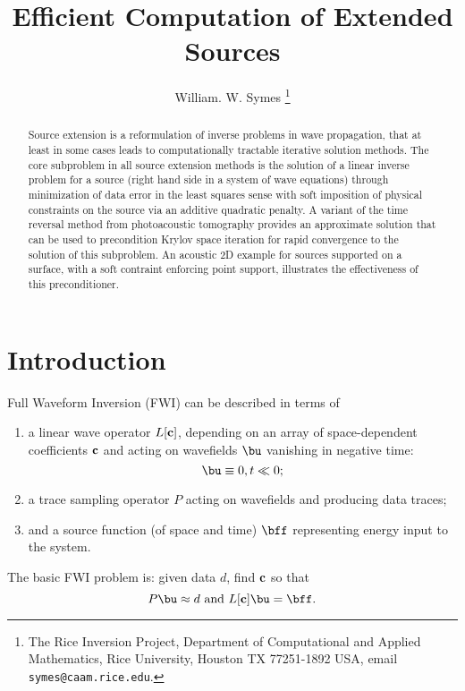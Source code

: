 \title{Efficient Computation of Extended Sources}
\author{William. W. Symes \thanks{The Rice Inversion Project,
Department of Computational and Applied Mathematics, Rice University,
Houston TX 77251-1892 USA, email {\tt symes@caam.rice.edu}.}}



\maketitle
\begin{abstract}
Source extension is a reformulation of inverse problems in wave propagation, that at least in some cases leads to computationally tractable iterative solution methods. The core subproblem in all source extension methods is the solution of a linear inverse problem for a source (right hand side in a system of wave equations) through minimization of data error in the least squares sense with soft imposition of physical constraints on the source via an additive quadratic penalty. A variant of the time reversal method from photoacoustic tomography provides an approximate solution that can be used to precondition Krylov space iteration for rapid convergence to the solution of this subproblem. An acoustic 2D example for sources supported on a surface, with a soft contraint enforcing point support, illustrates the effectiveness of this preconditioner.
\end{abstract}

\section{Introduction}
Full Waveform Inversion (FWI) can be described in terms of 
\begin{enumerate}
\item a linear wave operator $L[\bf{c}]$, depending on an array of space-dependent coefficients $\bf{c}$ and acting on wavefields $\bu$ vanishing in negative time:
\begin{equation}
\label{eqn:init}
\bu \equiv 0, t \ll 0; 
\end{equation}
\item a trace sampling operator $P$ acting on wavefields and producing data traces;
\item and a source function (of space and time) $\bff$ representing energy input to the system. 
\end{enumerate}
The basic FWI problem is: given data $d$, find $\bf{c}$ so that 
\begin{equation}
\label{eqn:fwi}
P\bu \approx d \mbox{ and } L[\bf{c}]\bu = \bff.
\end{equation}

